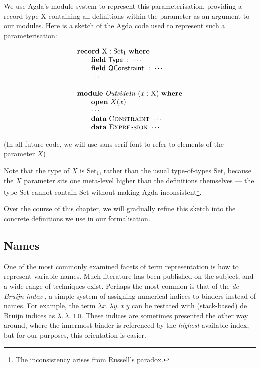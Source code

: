 \documentclass[a4paper]{jfp}
\begin{document}
\noindent We use Agda's module system to represent this parameterisation, providing a record type \textsc{X} containing all definitions within the
parameter as an argument to our modules. Here is a sketch of the Agda code used to represent such a parameterisation:


\begin{displaymath}
   \begin{array}{l}
   \textbf{record}\ \textsc{X} : \text{Set}_1\ \textbf{where} \\ \qquad
   \textbf{field}\ \textsf{Type}\ :\  \cdots \\ \qquad 
   \textbf{field}\ \textsf{QConstraint}\ :\ \cdots \\ \qquad \cdots \\\\
   \textbf{module}\ \mathit{OutsideIn}\ ( x : \textsc{X})\ \textbf{where} \\ \qquad \textbf{open}\ X(x)\\ \qquad \cdots \\
   \qquad \textbf{data}\ \textsc{Constraint}\ \cdots \\ 
   \qquad \textbf{data}\ \textsc{Expression}\ \cdots \\ 
   \end{array}
\end{displaymath}

(In all future code, we will use \textsf{sans-serif font} to refer to elements of the parameter $X$)

Note that the type of $X$ is $\text{Set}_1$, rather than the usual type-of-types $\text{Set}$, because the $X$ parameter sits one meta-level higher
than the definitions themselves --- the type $\text{Set}$ cannot contain $\text{Set}$ without making Agda inconsistent\footnote{The inconsistency
   arises from Russell's paradox.}.

Over the course of this chapter, we will gradually refine this sketch into the concrete definitions we use in our formalisation. 


\subsection{Names}

One of the most commonly examined facets of term representation is how to represent variable names. Much literature has been published on the subject,
and a wide range of techniques exist. Perhaps the most common is that of the \emph{de Bruijn index} \cite{deBruijn:1972tm}, a simple system of
assigning numerical indices to binders instead of names. For example, the term $\lambda x.\ \lambda y.\ x\ y$ can be restated with (stack-based) de
Bruijn indices as $\lambda.\ \lambda.\ \mathtt{1}\ \mathtt{0}$. These indices are sometimes presented the other way around, where the innermost binder
is referenced by the \emph{highest} available index, but for our purposes, this orientation is easier. 
\end{document}
